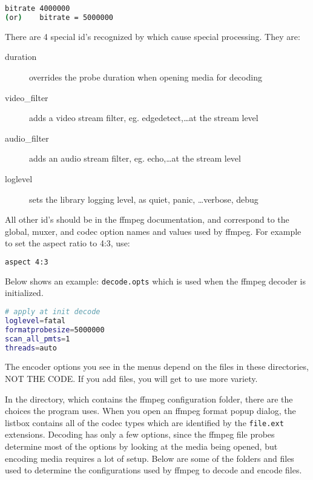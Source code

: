\begin{lstlisting}[language=bash,numbers=none]
      bitrate 4000000
(or)	bitrate = 5000000
\end{lstlisting}

There are 4 special id's recognized by \CGG{} which cause special processing.  They are:

\begin{description}
    \item[duration] overrides the probe duration when opening media for decoding
    \item[video\_filter] adds a video stream filter, eg. edgedetect,\dots at the stream level
    \item[audio\_filter] adds an audio stream filter, eg. echo,\dots at the stream level
    \item[loglevel] sets the library logging level, as quiet, panic, \dots verbose, debug
\end{description}

All other id's should be in the ffmpeg documentation, and correspond to the global, muxer, and codec option names and values used by ffmpeg.  For example to set the aspect ratio to 4:3, use:

\begin{lstlisting}[language=bash,numbers=none]
aspect 4:3
\end{lstlisting}

Below shows an example:  \texttt{decode.opts} which is used when the ffmpeg decoder is initialized.

\begin{lstlisting}[language=bash,numbers=none]
# apply at init decode
loglevel=fatal
formatprobesize=5000000
scan_all_pmts=1
threads=auto
\end{lstlisting}

The encoder options you see in the \CGG{} menus depend on the files in these directories, \textsc{NOT THE CODE}.  If you add files, you will get to use more variety.

In the \textit{\CGG{}} directory, which contains the ffmpeg configuration folder, there are the choices the program uses.  When you open an ffmpeg format popup dialog, the listbox contains all of the codec types which are identified by the \texttt{file.ext} extensions.  Decoding has only a few options, since the ffmpeg file probes determine most of the options by looking at the media being opened, but encoding media requires a lot of setup.  Below are some of the folders and files used to determine the configurations used by ffmpeg to decode and encode files.

